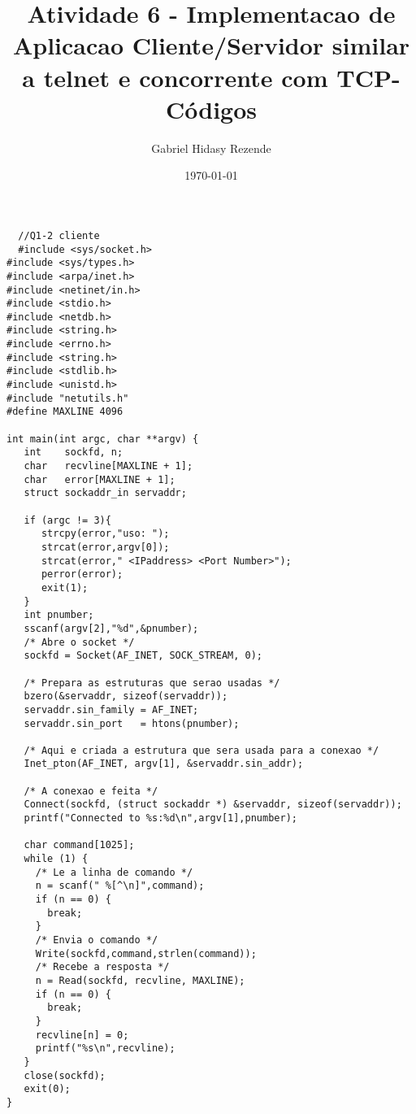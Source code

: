 \documentclass[11pt]{article}
\author{Gabriel Hidasy Rezende}
\date{\today}
\title{Atividade 6 - Implementacao de Aplicacao Cliente/Servidor similar a telnet e concorrente com TCP-
  Códigos}
\begin{document}
\maketitle

\begin{lstlisting}
  //Q1-2 cliente
  #include <sys/socket.h>
#include <sys/types.h>
#include <arpa/inet.h>
#include <netinet/in.h>
#include <stdio.h>
#include <netdb.h>
#include <string.h>
#include <errno.h>
#include <string.h>
#include <stdlib.h>
#include <unistd.h>
#include "netutils.h"
#define MAXLINE 4096

int main(int argc, char **argv) {
   int    sockfd, n;
   char   recvline[MAXLINE + 1];
   char   error[MAXLINE + 1];
   struct sockaddr_in servaddr;

   if (argc != 3){
      strcpy(error,"uso: ");
      strcat(error,argv[0]);
      strcat(error," <IPaddress> <Port Number>");
      perror(error);
      exit(1);
   }
   int pnumber;
   sscanf(argv[2],"%d",&pnumber);
   /* Abre o socket */
   sockfd = Socket(AF_INET, SOCK_STREAM, 0);

   /* Prepara as estruturas que serao usadas */
   bzero(&servaddr, sizeof(servaddr));
   servaddr.sin_family = AF_INET;
   servaddr.sin_port   = htons(pnumber);

   /* Aqui e criada a estrutura que sera usada para a conexao */
   Inet_pton(AF_INET, argv[1], &servaddr.sin_addr);

   /* A conexao e feita */
   Connect(sockfd, (struct sockaddr *) &servaddr, sizeof(servaddr));
   printf("Connected to %s:%d\n",argv[1],pnumber);

   char command[1025];
   while (1) {
     /* Le a linha de comando */
     n = scanf(" %[^\n]",command);
     if (n == 0) {
       break;
     }
     /* Envia o comando */
     Write(sockfd,command,strlen(command));
     /* Recebe a resposta */
     n = Read(sockfd, recvline, MAXLINE);
     if (n == 0) {
       break;
     }
     recvline[n] = 0;
     printf("%s\n",recvline);
   }
   close(sockfd);
   exit(0);
}

\end{lstlisting}
\end{document}
